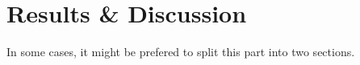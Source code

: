 \section{Results \& Discussion}

In some cases, it might be prefered to split this part into two sections.
